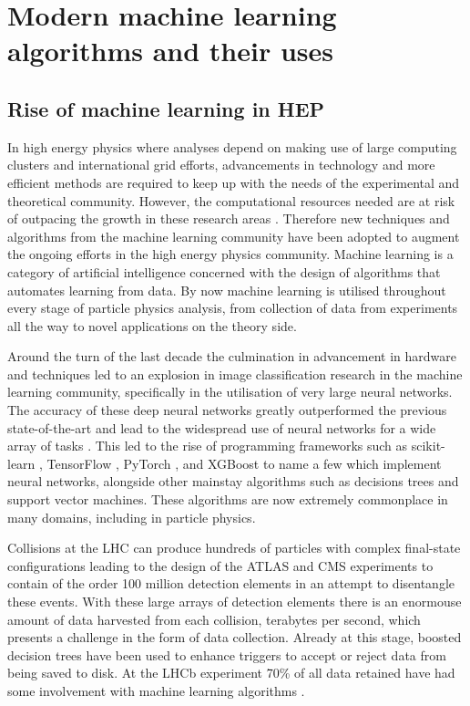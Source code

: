 \documentclass[main.tex]{subfiles}
\begin{document}
\chapter{Modern machine learning algorithms and their uses}
\label{chapter:ml}
\section{Rise of machine learning in HEP}
    In high energy physics where analyses
    depend on making use of large computing clusters
    and international grid efforts, advancements
    in technology and more efficient methods are
    required to keep up with the needs of the
    experimental and theoretical community.
    However, the computational resources needed
    are at risk of outpacing the growth in these research
    areas \cite{Bothmann:2022thx}. Therefore new techniques and
    algorithms from the machine learning community
    have been adopted to augment the ongoing efforts
    in the high energy physics community. Machine
    learning is a category of artificial intelligence
    concerned with the design of algorithms that
    automates learning from data.
    By now machine learning is utilised throughout
    every stage of particle physics analysis, from collection
    of data from experiments all the way to novel
    applications on the theory side.

    Around the turn of the last decade the culmination
    in advancement in hardware and techniques led to an
    explosion in image classification research in the
    machine learning community, specifically in the
    utilisation of very large neural networks. The accuracy
    of these deep neural networks greatly outperformed the
    previous state-of-the-art \cite{NIPS2012_c399862d,russakovsky2015imagenet} and
    lead to the widespread use of neural networks for a
    wide array of tasks \cite{Schmidhuber_2015}.
    This led to the rise of programming
    frameworks such as scikit-learn \cite{scikit-learn},
    TensorFlow \cite{tensorflow2015-whitepaper},
    PyTorch \cite{paszke2019pytorch},
    and XGBoost \cite{Chen:2016:XST:2939672.2939785}
    to name a few which implement neural networks, alongside
    other mainstay algorithms such as decisions trees
    and support vector machines.
    These algorithms are now extremely commonplace
    in many domains, including in particle physics. 

    Collisions at the LHC can produce hundreds of
    particles with complex final-state configurations
    leading to the design of the ATLAS and CMS experiments
    to contain of the order 100 million detection elements
    in an attempt to disentangle these events. With these
    large arrays of detection elements there is an enormouse
    amount of data harvested from each collision, terabytes
    per second, which presents a challenge in the form of
    data collection.
    Already at this stage, boosted decision trees
    have been used to enhance triggers \cite{CMS:2020cmk} to accept or
    reject data from being saved to disk. At the LHCb
    experiment 70\% of all data retained have had
    some involvement with machine learning algorithms \cite{LHCb:2014set}.
\end{document}
